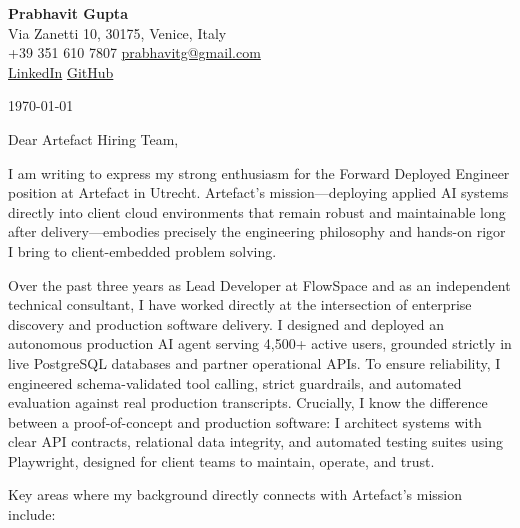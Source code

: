 \documentclass[11pt,a4paper]{article}
\begin{document}
\begin{center}
    {\huge \textbf{Prabhavit Gupta}} \\
    \vspace{4pt}
    Via Zanetti 10, 30175, Venice, Italy \\
    +39 351 610 7807 \textbar{} \href{mailto:prabhavitg@gmail.com}{prabhavitg@gmail.com} \\
    \href{https://www.linkedin.com/in/prabhavit/}{LinkedIn} \textbar{} \href{https://github.com/prab-gupta}{GitHub}
\end{center}

\vspace{12pt}

\noindent \today

\vspace{6pt}

\noindent Dear Artefact Hiring Team,

\vspace{6pt}

\noindent I am writing to express my strong enthusiasm for the Forward Deployed Engineer position at Artefact in Utrecht. Artefact's mission—deploying applied AI systems directly into client cloud environments that remain robust and maintainable long after delivery—embodies precisely the engineering philosophy and hands-on rigor I bring to client-embedded problem solving.

\noindent Over the past three years as Lead Developer at FlowSpace and as an independent technical consultant, I have worked directly at the intersection of enterprise discovery and production software delivery. I designed and deployed an autonomous production AI agent serving 4,500+ active users, grounded strictly in live PostgreSQL databases and partner operational APIs. To ensure reliability, I engineered schema-validated tool calling, strict guardrails, and automated evaluation against real production transcripts. Crucially, I know the difference between a proof-of-concept and production software: I architect systems with clear API contracts, relational data integrity, and automated testing suites using Playwright, designed for client teams to maintain, operate, and trust.

\noindent Key areas where my background directly connects with Artefact's mission include:
\end{document}
